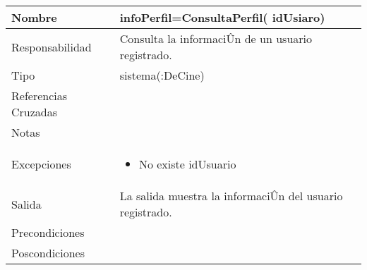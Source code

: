 \documentclass{article}
\begin{document}
\begin{table}[h]
\begin{tabular}{|l|l|l|l|l|l|}
\hline
\multicolumn{2}{|p{3cm}|}{Nombre} & \multicolumn{4}{p{10cm}|}{\textbf{infoPerfil=ConsultaPerfil( idUsiaro)}}\\
\hline
\multicolumn{2}{|p{3cm}|}{Responsabilidad} & \multicolumn{4}{p{10cm}|}{Consulta la informaciÛn de un usuario registrado.} \\
\hline
\multicolumn{2}{|p{3cm}|}{Tipo} & \multicolumn{4}{p{10cm}|}{sistema(:DeCine)} \\
\hline
\multicolumn{2}{|p{3cm}|}{Referencias Cruzadas} & \multicolumn{4}{p{10cm}|}{} \\
\hline
\multicolumn{2}{|p{3cm}|}{Notas} & \multicolumn{4}{p{10cm}|}{} \\
\hline
\multicolumn{2}{|p{3cm}|}{Excepciones} & \multicolumn{4}{p{10cm}|}{\begin{itemize}
\item No existe idUsuario
\end{itemize}} \\
\hline
\multicolumn{2}{|p{3cm}|}{Salida} & \multicolumn{4}{p{10cm}|}{La salida muestra la informaciÛn del usuario registrado.} \\
\hline
\multicolumn{2}{|p{3cm}|}{Precondiciones} & \multicolumn{4}{p{10cm}|}{} \\
\hline
\multicolumn{2}{|p{3cm}|}{Poscondiciones} & \multicolumn{4}{p{10cm}|}{} \\
\hline
\end{tabular}
\end{table}
\end{document}
